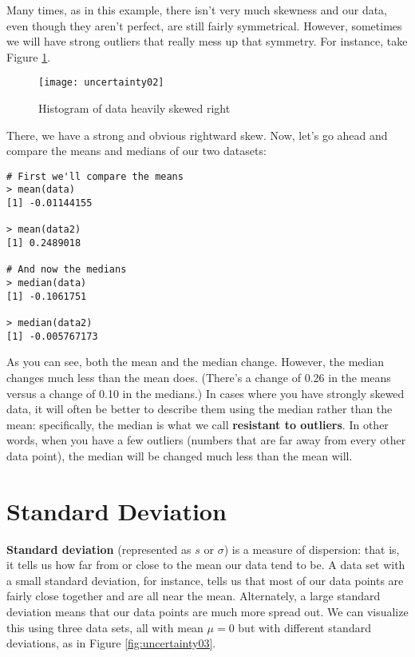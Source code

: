 Many times, as in this example, there isn't very much skewness and our data, even though they aren't perfect, are still fairly symmetrical. However, sometimes we will have strong outliers that really mess up that symmetry. For instance, take Figure \ref{fig:uncertainty02}.

\begin{figure}[h!]
\texttt{[image: uncertainty02]}
\caption{Histogram of data heavily skewed right}
\label{fig:uncertainty02}
\end{figure}

There, we have a strong and obvious rightward skew. Now, let's go ahead and compare the means and medians of our two datasets:

\begin{framed}
\begin{Verbatim}[samepage=TRUE]
# First we'll compare the means
> mean(data)
[1] -0.01144155
 
> mean(data2)
[1] 0.2489018
 
# And now the medians
> median(data)
[1] -0.1061751
 
> median(data2)
[1] -0.005767173
\end{Verbatim}
\end{framed}

As you can see, both the mean and the median change. However, the median changes much less than the mean does. (There's a change of 0.26 in the means versus a change of 0.10 in the medians.) In cases where you have strongly skewed data, it will often be better to describe them using the median rather than the mean: specifically, the median is what we call \textbf{resistant to outliers}. In other words, when you have a few outliers (numbers that are far away from every other data point), the median will be changed much less than the mean will.

\section{Standard Deviation}
\textbf{Standard deviation}  (represented as $s$ or $\sigma$) is a measure of dispersion: that is, it tells us how far from or close to the mean our data tend to be. A data set with a small standard deviation, for instance, tells us that most of our data points are fairly close together and are all near the mean. Alternately, a large standard deviation means that our data points are much more spread out. We can visualize this using three data sets, all with mean $\mu=0$ but with different standard deviations, as in Figure \ref{fig:uncertainty03}.

